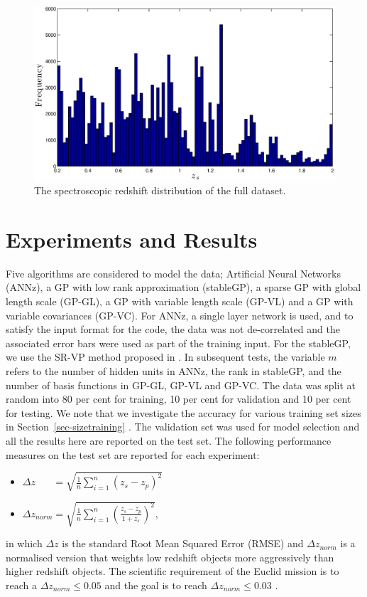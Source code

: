 \documentclass[useAMS,usenatbib,fleqn]{mn2e}
\begin{document}
\begin{figure}
       \centering
       \includegraphics[width=\columnwidth]{figures/zspec.eps}
        \caption{The spectroscopic redshift distribution of the full dataset.}
       \label{fig-zspec-hostogram}
\end{figure}

\section{Experiments and Results}
\label{sec-experiments}

Five algorithms are considered to model the data; Artificial Neural Networks (ANNz), a GP with low rank approximation (stableGP), a sparse GP with global length scale (GP-GL), a GP with variable length scale (GP-VL) and a GP with variable covariances (GP-VC). For ANNz, a single layer network is used, and to satisfy the input format for the code, the data was not de-correlated and the associated error bars were used as part of the training input. For the stableGP, we use the SR-VP method proposed in \citep{foster2009}. In subsequent tests, the variable $m$ refers to the number of hidden units in ANNz, the rank in stableGP, and the number of basis functions in GP-GL, GP-VL and GP-VC. The data was split at random into 80 per cent for training, 10 per cent for validation and 10 per cent for testing. We note that we investigate the accuracy for various training set sizes in Section~\ref{sec-sizetraining} . The validation set was used for model selection and all the results here are reported on the test set. The following performance measures on the test set are reported for each experiment:
\begin{itemize}
  \item $\Delta z_{\phantom{norm}} = \sqrt{\frac{1}{n}\sum_{i=1}^{n}\left(z_{s}-z_{p}\right)^{2}}$
  \item $\Delta z_{norm} = \sqrt{\frac{1}{n}\sum_{i=1}^{n}\left(\frac{z_{s}-z_{p}}{1+z_{s}}\right)^{2}}$,
\end{itemize}
in which $\Delta z$ is the standard Root Mean Squared Error (RMSE) and $\Delta z_{norm}$ is a normalised version that weights low redshift objects more aggressively than higher redshift objects. The scientific requirement of the Euclid mission is to reach a $\Delta z_{norm} \le 0.05$ and the goal is to reach $\Delta z_{norm} \le 0.03$ \citep{laureijs2011}.
\end{document}
